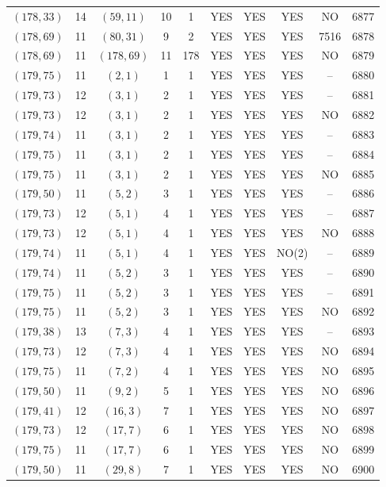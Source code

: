 \begin{longtable}{|c|c|c|c|c|c|c|c|c|c|}
$(178, 33)$ & 14 & $(59, 11)$ & 10 & 1 & YES & YES & YES & NO & 6877\\
$(178, 69)$ & 11 & $(80, 31)$ & 9 & 2 & YES & YES & YES & 7516 & 6878\\
$(178, 69)$ & 11 & $(178, 69)$ & 11 & 178 & YES & YES & YES & NO & 6879\\
$(179, 75)$ & 11 & $(2, 1)$ & 1 & 1 & YES & YES & YES & -- & 6880\\
$(179, 73)$ & 12 & $(3, 1)$ & 2 & 1 & YES & YES & YES & -- & 6881\\
$(179, 73)$ & 12 & $(3, 1)$ & 2 & 1 & YES & YES & YES & NO & 6882\\
$(179, 74)$ & 11 & $(3, 1)$ & 2 & 1 & YES & YES & YES & -- & 6883\\
$(179, 75)$ & 11 & $(3, 1)$ & 2 & 1 & YES & YES & YES & -- & 6884\\
$(179, 75)$ & 11 & $(3, 1)$ & 2 & 1 & YES & YES & YES & NO & 6885\\
$(179, 50)$ & 11 & $(5, 2)$ & 3 & 1 & YES & YES & YES & -- & 6886\\
$(179, 73)$ & 12 & $(5, 1)$ & 4 & 1 & YES & YES & YES & -- & 6887\\
$(179, 73)$ & 12 & $(5, 1)$ & 4 & 1 & YES & YES & YES & NO & 6888\\
$(179, 74)$ & 11 & $(5, 1)$ & 4 & 1 & YES & YES & NO(2) & -- & 6889\\
$(179, 74)$ & 11 & $(5, 2)$ & 3 & 1 & YES & YES & YES & -- & 6890\\
$(179, 75)$ & 11 & $(5, 2)$ & 3 & 1 & YES & YES & YES & -- & 6891\\
$(179, 75)$ & 11 & $(5, 2)$ & 3 & 1 & YES & YES & YES & NO & 6892\\
$(179, 38)$ & 13 & $(7, 3)$ & 4 & 1 & YES & YES & YES & -- & 6893\\
$(179, 73)$ & 12 & $(7, 3)$ & 4 & 1 & YES & YES & YES & NO & 6894\\
$(179, 75)$ & 11 & $(7, 2)$ & 4 & 1 & YES & YES & YES & NO & 6895\\
$(179, 50)$ & 11 & $(9, 2)$ & 5 & 1 & YES & YES & YES & NO & 6896\\
$(179, 41)$ & 12 & $(16, 3)$ & 7 & 1 & YES & YES & YES & NO & 6897\\
$(179, 73)$ & 12 & $(17, 7)$ & 6 & 1 & YES & YES & YES & NO & 6898\\
$(179, 75)$ & 11 & $(17, 7)$ & 6 & 1 & YES & YES & YES & NO & 6899\\
$(179, 50)$ & 11 & $(29, 8)$ & 7 & 1 & YES & YES & YES & NO & 6900\\

\end{longtable}
